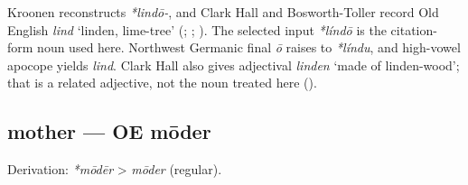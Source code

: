 \documentclass[
  british,
  a4paper,
]{article}
\begin{document}
Kroonen reconstructs \emph{*lindō-}, and Clark Hall and Bosworth-Toller
record Old English \emph{lind} `linden, lime-tree'
(;
;
). The
selected input \emph{*líndō} is the citation-form noun used here.
Northwest Germanic final \emph{ō} raises to \emph{*líndu}, and
high-vowel apocope yields \emph{lind}. Clark Hall also gives adjectival
\emph{linden} `made of linden-wood'; that is a related adjective, not
the noun treated here ().

\subsection{mother --- OE mōder}\label{mother-oe-mux14dder}

Derivation: \emph{*mōdēr} \textgreater{} \emph{mōder} (regular).

\begingroup
\setlength{\fboxsep}{6pt}
\end{document}
